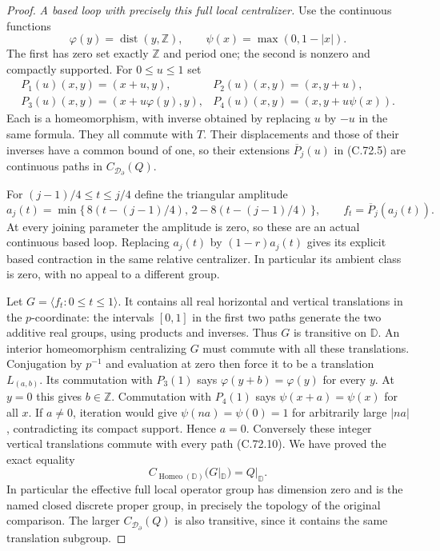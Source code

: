 \begin{proof}
\emph{A based loop with precisely this full local centralizer.}
Use the continuous functions
\[
 \varphi(y)=\operatorname{dist}(y,\mathbb Z),
                 \qquad\psi(x)=\max(0,1-|x|).
                                                               \tag{C.72.9}
\]
The first has zero set exactly $\mathbb Z$ and
period one; the second is nonzero and compactly
supported. For $0\leq u\leq1$ set
\[
 \begin{array}{ll}
 P_1(u)(x,y)=(x+u,y),&
 P_2(u)(x,y)=(x,y+u),\\
 P_3(u)(x,y)=(x+u\varphi(y),y),&
 P_4(u)(x,y)=(x,y+u\psi(x)).
 \end{array}                                                   \tag{C.72.10}
\]
Each is a homeomorphism, with inverse obtained by
replacing $u$ by $-u$ in the same formula. They
all commute with $T$. Their displacements and those
of their inverses have a common bound of one, so
their extensions $\overline P_j(u)$ in (C.72.5)
are continuous paths in
$C_{\mathcal D_\partial}(Q)$.

For $(j-1)/4\leq t\leq j/4$ define the triangular
amplitude
\[
 a_j(t)=
   \min\{\,8(t-(j-1)/4),\,2-8(t-(j-1)/4)\,\},
 \qquad f_t=\overline P_j(a_j(t)).
                                                               \tag{C.72.11}
\]
At every joining parameter the amplitude is zero,
so these are an actual continuous based loop.
Replacing $a_j(t)$ by $(1-r)a_j(t)$ gives its
explicit based contraction in the same relative
centralizer. In particular its ambient class is
zero, with no appeal to a different group.

Let $G=\langle f_t:0\leq t\leq1\rangle$.
It contains all real horizontal and vertical
translations in the $p$-coordinate: the intervals
$[0,1]$ in the first two paths generate the two
additive real groups, using products and inverses.
Thus $G$ is transitive on $\mathbb D$.
An interior homeomorphism centralizing $G$ must
commute with all these translations. Conjugation
by $p^{-1}$ and evaluation at zero then force it
to be a translation $L_{(a,b)}$.
Its commutation with $P_3(1)$ says
$\varphi(y+b)=\varphi(y)$ for every $y$.
At $y=0$ this gives $b\in\mathbb Z$.
Commutation with $P_4(1)$ says
$\psi(x+a)=\psi(x)$ for all $x$.
If $a\ne0$, iteration would give
$\psi(na)=\psi(0)=1$ for arbitrarily large $|na|$,
contradicting its compact support.
Hence $a=0$. Conversely these integer vertical
translations commute with every path (C.72.10).
We have proved the exact equality
\[
             C_{\operatorname{Homeo}(\mathbb D)}(G|_{\mathbb D})
                       =Q|_{\mathbb D}.
                                                               \tag{C.72.12}
\]
In particular the effective full local operator
group has dimension zero and is the named closed
discrete proper group, in precisely the topology
of the original comparison. The larger
$C_{\mathcal D_\partial}(Q)$ is also transitive,
since it contains the same translation subgroup.


\end{proof}
